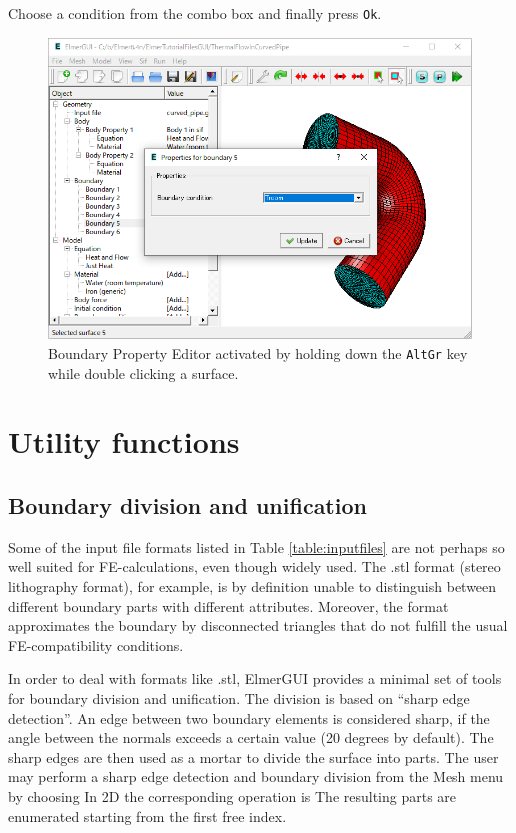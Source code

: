 Choose a condition from the combo box and finally press \texttt{Ok}.
\begin{figure}[htb]
\begin{center}
 \includegraphics[scale=0.5]{images/boundaryproperties.png}
\caption{Boundary Property Editor activated by holding down the \texttt{AltGr} key while double
clicking a surface.}
\label{fig:boundarypropertyeditor}
\end{center}
\end{figure}

\chapter{Utility functions}

\section{Boundary division and unification}

Some of the input file formats listed in Table \ref{table:inputfiles} are not perhaps so well suited for
FE-calculations, even though widely used. The .stl format (stereo lithography format),
for example, is by definition unable to distinguish between different boundary parts
with different attributes. Moreover, the format approximates the boundary by disconnected
triangles that do not fulfill the usual FE-compatibility conditions.

In order to deal with formats like .stl, ElmerGUI provides a minimal set of tools for
boundary division and unification. The division is based on ``sharp edge detection''.
An edge between two boundary elements is considered sharp, if the angle between the
normals exceeds a certain value (20 degrees by default). The sharp edges are then used
as a mortar to divide the surface into parts. The user may perform a sharp edge detection
and boundary division from the Mesh menu by choosing
\noindent In 2D the corresponding operation is
\noindent The resulting parts are enumerated starting from the first free index.

